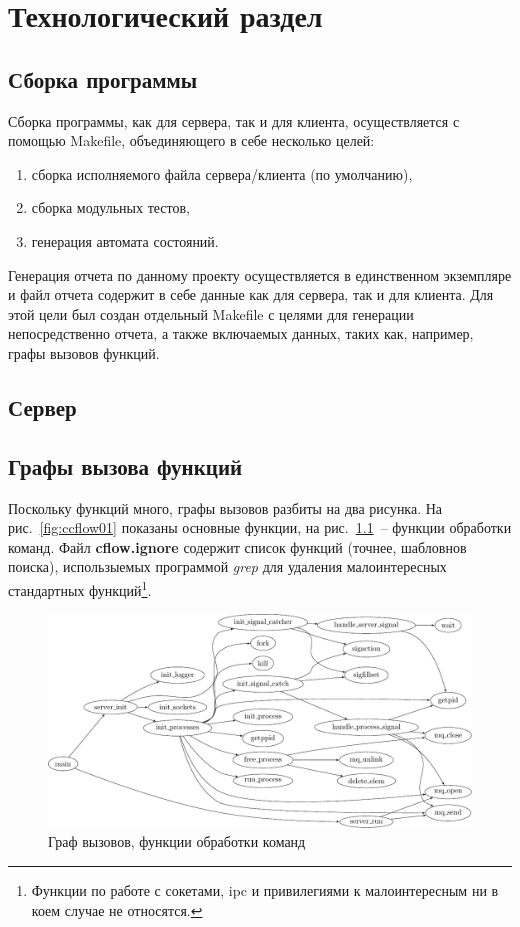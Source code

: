 \documentclass[a4paper,12pt]{report}
\begin{document}
\chapter{Технологический раздел}

\section{Сборка программы}

Сборка программы, как для сервера, так и для клиента, осуществляется с помощью Makefile, объединяющего в себе несколько целей:
\begin{enumerate}
\item сборка исполняемого файла сервера/клиента (по умолчанию),
\item сборка модульных тестов,
\item генерация автомата состояний.
\end{enumerate}
Генерация отчета по данному проекту осуществляется в единственном экземпляре и файл отчета содержит в себе данные как для сервера, так и для клиента. Для этой цели был создан отдельный Makefile с целями для генерации непосредственно отчета, а также включаемых данных, таких как, например, графы вызовов функций.

\section{Сервер}

\section{Графы вызова функций}

Поскольку функций много, графы вызовов разбиты на два рисунка. На рис.~\ref{fig:ccflow01} показаны основные функции, на рис.~\ref{fig:scflow01}~-- функции обработки команд. Файл \textbf{cflow.ignore} содержит список функций (точнее, шабловнов поиска), использыемых программой \textit{grep} для удаления малоинтересных стандартных функций\footnote{Функции по работе с сокетами, ipc и привилегиями к малоинтересным ни в коем случае не относятся.}.


\begin{figure}
\centering
\includegraphics[width=\textwidth]{include/scflow01_dot.pdf}
\caption{Граф вызовов, функции обработки команд}
\label{fig:scflow01}
\end{figure}
\end{document}
